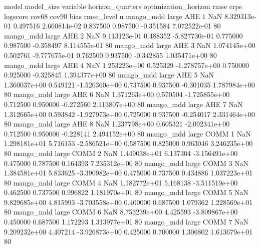             model model_size variable  horizon_quarters optimization_horizon         rmse          crps      logscore    cov68    cov90           bias   rmse_level  n
        mango_mdd      large      AHE                 1                  NaN 8.329313e-01      0.497516  2.660814e-02 0.837500 0.987500      -0.351584 7.072522e-01 80
        mango_mdd      large      AHE                 2                  NaN 9.113123e-01      0.488352 -5.827730e-01 0.775000 0.987500      -0.358497 8.114555e-01 80
        mango_mdd      large      AHE                 3                  NaN 1.074145e+00      0.502761 -9.777675e-01 0.762500 0.937500      -0.342855 1.035471e+00 80
        mango_mdd      large      AHE                 4                  NaN 1.253223e+00      0.525329 -1.278757e+00 0.750000 0.925000      -0.325845 1.394377e+00 80
        mango_mdd      large      AHE                 5                  NaN 1.360037e+00      0.549121 -1.520360e+00 0.737500 0.937500      -0.301035 1.787984e+00 80
        mango_mdd      large      AHE                 6                  NaN 1.371263e+00      0.570504 -1.725855e+00 0.712500 0.950000      -0.272560 2.113807e+00 80
        mango_mdd      large      AHE                 7                  NaN 1.312665e+00      0.593842 -1.927973e+00 0.725000 0.937500      -0.254017 2.331464e+00 80
        mango_mdd      large      AHE                 8                  NaN 1.237798e+00      0.605321 -2.092341e+00 0.712500 0.950000      -0.228141 2.494152e+00 80
        mango_mdd      large     COMM                 1                  NaN 1.298181e+01      5.716153 -2.586521e+00 0.587500 0.825000       0.963046 3.246235e+00 80
        mango_mdd      large     COMM                 2                  NaN 1.449038e+01      6.137304 -3.156491e+00 0.475000 0.787500       0.164393 7.235312e+00 80
        mango_mdd      large     COMM                 3                  NaN 1.384581e+01      5.833625 -3.390982e+00 0.475000 0.737500       0.434886 1.037223e+01 80
        mango_mdd      large     COMM                 4                  NaN 1.182772e+01      5.168138 -3.511519e+00 0.462500 0.737500       0.996822 1.181970e+01 80
        mango_mdd      large     COMM                 5                  NaN 9.829685e+00      4.815993 -3.703558e+00 0.400000 0.687500       1.079362 1.228569e+01 80
        mango_mdd      large     COMM                 6                  NaN 8.753239e+00      4.425593 -3.809867e+00 0.450000 0.687500       1.172293 1.313977e+01 80
        mango_mdd      large     COMM                 7                  NaN 9.209232e+00      4.407214 -3.926873e+00 0.425000 0.700000       1.306802 1.613679e+01 80
